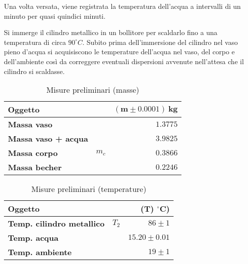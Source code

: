 \documentclass{article}
\begin{document}
	Una volta versata, viene registrata la temperatura dell'acqua a intervalli di un minuto per quasi quindici minuti.
	
	Si immerge il cilindro metallico in un bollitore per scaldarlo fino a una temperatura di circa \(90 ^\circ C\). Subito prima dell'immersione del cilindro nel vaso pieno d'acqua si acquisiscono le temperature dell'acqua nel vaso, del corpo e dell'ambiente così da correggere eventuali dispersioni avvenute nell'attesa che il cilindro si scaldasse.
	
	\vspace{1cm}
	\begin{minipage}{0.4\textwidth}
		\begin{table}[H] \centering
			\begin{small}
				\begin{tabular}{@{}lrr@{}}\toprule
					\textbf{Oggetto}& &  \(\boldsymbol{(m \pm 0.0001) \SI{}{\kilogram}}\) \\ \midrule
					\textbf{Massa vaso}	&	 & \(1.3775\)   \\  \hdashline
					\textbf{Massa vaso + acqua}	&	 & \(3.9825\)   \\  \hdashline
					\textbf{Massa corpo}	& \(m_{c}\)	 & \(0.3866\)   \\  \hdashline
					\textbf{Massa becher}	&	 & \(0.2246\)   \\
					\bottomrule
				\end{tabular}
			\end{small}
			\caption{Misure preliminari (masse)}
		\end{table}
	\end{minipage}
	\begin{minipage}{0.6\textwidth}
		\begin{table}[H] \centering
			\begin{small}
				\begin{tabular}{@{}lrr@{}}\toprule
					\textbf{Oggetto}					&  			& \textbf{(\(\boldsymbol{T}\))} \(\boldsymbol{^\circ C}\))\\ \midrule
					\textbf{Temp. cilindro metallico}	& 	\(T_{2}\)		& \(86 \pm 1\)	 \\  \hdashline
					\textbf{Temp. acqua}				&					&\(15.20 \pm 0.01\)		 	 \\  \hdashline
					\textbf{Temp. ambiente}				&					& \(19 \pm 1\)		 	  \\  
					\bottomrule
				\end{tabular}
			\end{small}
			\caption{Misure preliminari (temperature)}
		\end{table}
	\end{minipage}
	\vspace{1cm}
	
\end{document}
